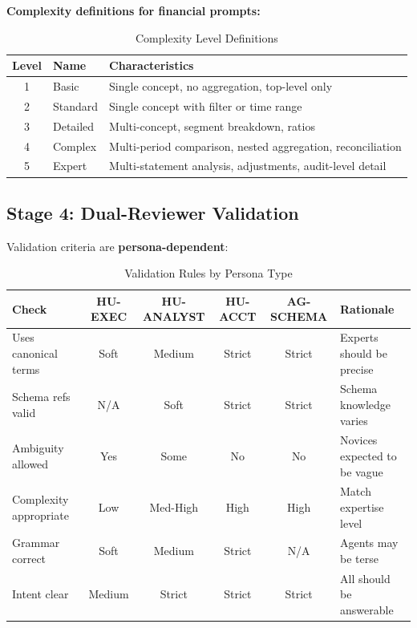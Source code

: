 \textbf{Complexity definitions for financial prompts:}

\begin{table}[htbp]
\centering
\footnotesize
\caption{Complexity Level Definitions}
\label{tab:complexity-levels}
\begin{tabularx}{\textwidth}{@{}c l X@{}}
\toprule
\textbf{Level} & \textbf{Name} & \textbf{Characteristics} \\
\midrule
1 & Basic & Single concept, no aggregation, top-level only \\
2 & Standard & Single concept with filter or time range \\
3 & Detailed & Multi-concept, segment breakdown, ratios \\
4 & Complex & Multi-period comparison, nested aggregation, reconciliation \\
5 & Expert & Multi-statement analysis, adjustments, audit-level detail \\
\bottomrule
\end{tabularx}
\end{table}

\subsection{Stage 4: Dual-Reviewer Validation}

Validation criteria are \textbf{persona-dependent}:

\begin{table}[htbp]
\centering
\footnotesize
\caption{Validation Rules by Persona Type}
\label{tab:validation-persona}
\begin{tabularx}{\textwidth}{@{}l c c c c X@{}}
\toprule
\textbf{Check} & \textbf{HU-EXEC} & \textbf{HU-ANALYST} & \textbf{HU-ACCT} & \textbf{AG-SCHEMA} & \textbf{Rationale} \\
\midrule
Uses canonical terms & Soft & Medium & Strict & Strict & Experts should be precise \\
Schema refs valid & N/A & Soft & Strict & Strict & Schema knowledge varies \\
Ambiguity allowed & Yes & Some & No & No & Novices expected to be vague \\
Complexity appropriate & Low & Med-High & High & High & Match expertise level \\
Grammar correct & Soft & Medium & Strict & N/A & Agents may be terse \\
Intent clear & Medium & Strict & Strict & Strict & All should be answerable \\
\bottomrule
\end{tabularx}
\end{table}

